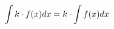 \documentclass[preview]{standalone}
\begin{document}
\begin{align*}
\special{dvisvgm:raw <g id='unique000'>}\int k \cdot f(x) dx = k \cdot \int f(x) dx\special{dvisvgm:raw </g>}
\end{align*}
\end{document}
